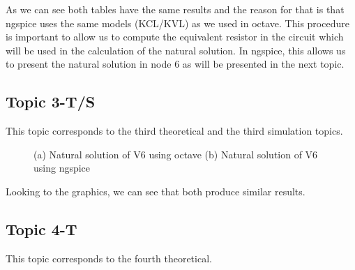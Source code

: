 As we can see both tables have the same results and the reason for that is that ngspice uses the same models (KCL/KVL) as we used in octave.
This procedure is important to allow us to compute the equivalent resistor in the circuit which will be used in the calculation of the natural solution.
In ngspice, this allows us to present the natural solution in node 6 as will be presented in the next topic. 

\newpage
\subsection{Topic 3-T/S}
This topic corresponds to the third theoretical and the third simulation topics.

\begin{figure}[h!]
            \centering
            \caption{(a) Natural solution of V6 using octave (b) Natural solution of V6 using ngspice }
            \label{fig:icte}
\end{figure}

Looking to the graphics, we can see that both produce similar results. 
\newpage
\subsection{Topic 4-T}
This topic corresponds to the fourth theoretical.


